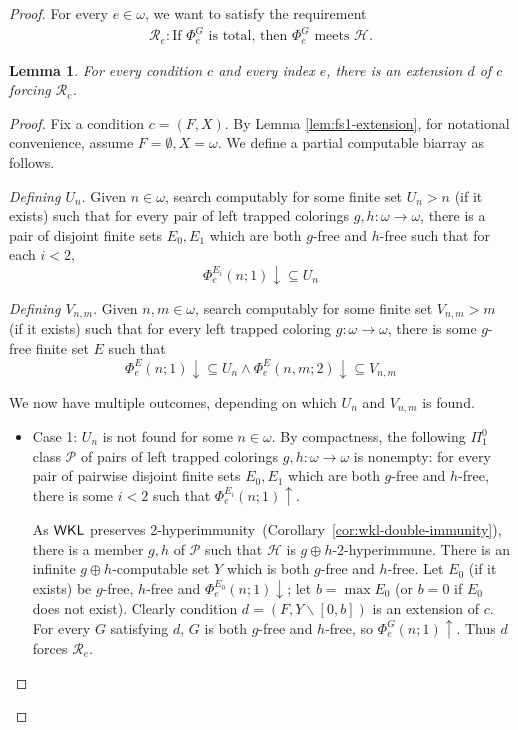 \documentclass{amsart}
\newtheorem{lemma}[theorem]{Lemma}
\theoremstyle{definition}
\theoremstyle{remark}
\numberwithin{equation}{section}
\theoremstyle{noparens}
\def\propertyL{2-hyperimmunity}
\def\hyper{2-hyperimmune}
\newcommand{\Hcal}{\mathcal{H}}
\newcommand{\Pcal}{\mathcal{P}}
\newcommand{\Rcal}{\mathcal{R}}
\renewcommand{\setminus}{\smallsetminus}
\newcommand{\s}[1]{\ensuremath{\sf{#1}}}
\DeclareMathOperator{\wkl}{\s{WKL}}
\begin{document}
\begin{proof}
For every $e \in \omega$, we want to satisfy the requirement
\begin{align}\nonumber
\Rcal_e: \text{If $\Phi^{  G}_e$ is total,
then $\Phi^{  G}_e$ meets $\Hcal$.}
\end{align}

\begin{lemma}\label{lem:fs1-left-trapped-preserves-2}
For every condition $c$ and every index $e$,
there is an extension $d$ of $c$ forcing $\Rcal_e$.
\end{lemma}
\begin{proof}

Fix a condition $c = (F, X)$. By Lemma \ref{lem:fs1-extension},
for notational convenience, assume
$F=\emptyset, X=\omega$.
 We define a partial computable biarray as follows.
\bigskip

\emph{Defining $U_n$}.
Given $n \in \omega$, search  computably for some
finite   set $U_n>n$ (if it exists) such that
for every pair of left trapped colorings $g, h : \omega \to \omega$,
there is a pair of disjoint finite sets $E_0, E_1  $ which are both $g$-free and $h$-free such that
for each $i < 2$,
$$
\Phi_e^{ E_i }(n;1) \downarrow \subseteq U_n
$$

\emph{Defining $V_{n,m}$}. Given $n, m \in \omega$, search  computably for some
finite  set $V_{n,m}>m$ (if it exists) such that for every
left trapped coloring $g : \omega \to \omega$,
there is some $g$-free finite set $E$ such that
$$
\Phi_e^{ E}(n;1) \downarrow \subseteq U_n
	\wedge \Phi_e^{ E}(n, m;2) \downarrow \subseteq V_{n,m}
$$
\smallskip

We now have multiple outcomes, depending on which $U_n$ and $V_{n,m}$ is found.
\begin{itemize}
	\item Case 1: $U_n$ is not found for some $n \in \omega$. By compactness, the following $\Pi^{0}_1$ class
	$\Pcal$ of  pairs of left trapped colorings $g, h : \omega \to \omega$ is nonempty:
	 for every pair of pairwise disjoint finite sets $E_0, E_1$
	which are both $g$-free and $h$-free, there is some $i < 2$ such that
	$\Phi_e^{ E_i}(n;1) \uparrow$.

	As $\wkl$ preserves \propertyL\
	(Corollary~\ref{cor:wkl-double-immunity}), there is a member $g, h$
	of $\Pcal$ such that
	$\Hcal$ is $g \oplus h $-\hyper.
	There is an infinite $g\oplus h$-computable set $Y$ which is both
	$g$-free and $h$-free.
	Let $E_0 $ (if it exists) be   $g$-free, $h$-free
and $\Phi_e^{E_0}(n;1) \downarrow$; let $b = \max E_0$ (or $b=0$ if $E_0$ does not exist).
	Clearly condition  $d = (F, Y \setminus [0,b])$ is an extension of $c$.
For every $G$ satisfying $d$, $G$ is both $g$-free and $h$-free,
so $\Phi_e^G(n;1)\uparrow$. Thus $d$ forces $\Rcal_e$.
	\bigskip


\end{itemize}
\end{proof}
\end{proof}
\end{document}
